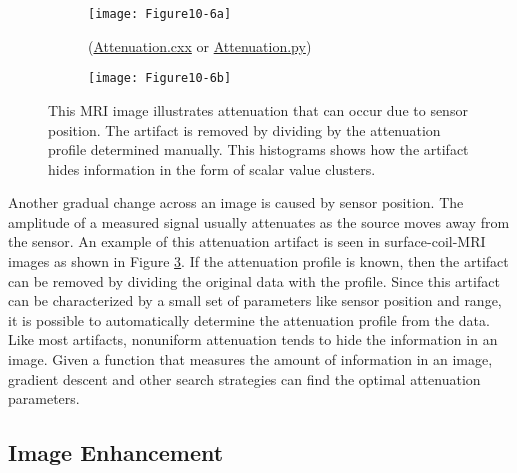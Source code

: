 \begin{figure}[htb]
	\begin{subfigure}[h]{0.96\linewidth}
		\texttt{[image: Figure10-6a]}
		\captionsetup{justification=centering}
		\caption*{(\href{https://lorensen.github.io/VTKExamples/site/Cxx/ImageProcessing/Attenuation/}{Attenuation.cxx} or \href{https://lorensen.github.io/VTKExamples/site/Python/ImageProcessing/Attenuation/}{Attenuation.py})} 
		\label{fig:Figure10-6a}
	\end{subfigure}
	\hfill
	\begin{subfigure}[h]{0.96\linewidth}
		\texttt{[image: Figure10-6b]}
		\captionsetup{justification=centering}
		\caption*{}
		\label{fig:Figure10-6b}
	\end{subfigure}
	\caption{This MRI image illustrates attenuation that can occur due to sensor position. The artifact is removed by dividing by the attenuation profile determined manually. This histograms shows how the artifact hides information in the form of scalar value clusters.}\label{fig:Figure10-6}
\end{figure}

Another gradual change across an image is caused by sensor position. The amplitude of a measured signal usually attenuates as the source moves away from the sensor. An example of this attenuation artifact is seen in surface-coil-MRI images as shown in Figure \ref{fig:Figure10-6}. If the attenuation profile is known, then the artifact can be removed by dividing the original data with the profile. Since this artifact can be characterized by a small set of parameters like sensor position and range, it is possible to automatically determine the attenuation profile from the data. Like most artifacts, nonuniform attenuation tends to hide the information in an image. Given a function that measures the amount of information in an image, gradient descent and other search strategies can find the optimal attenuation parameters.

\subsection{Image Enhancement}

